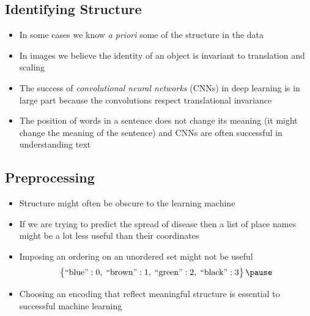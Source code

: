 
\begin{slide}
\section{Identifying Structure}

\begin{PauseHighLight}
  \begin{itemize}
  \item In some cases we know \textit{a priori} some of the structure
    in the data\pause
  \item In images we believe the identity of an object is invariant to
    translation and scaling\pause
  \item The success of \textit{convolutional neural networks} (CNNs)
    in deep learning is in large part because the convolutions respect
    translational invariance\pause
  \item The position of words in a sentence does not change its
    meaning (it might change the meaning of the sentence) and CNNs are
    often successful in understanding text\pause
  \end{itemize}
\end{PauseHighLight}

\end{slide}


\begin{slide}
\section{Preprocessing}

\begin{PauseHighLight}
  \begin{itemize}
  \item Structure might often be obscure to the learning machine\pause
  \item If we are trying to predict the spread of disease then a list
    of place names might be a lot less useful than their
    coordinates\pause
  \item Imposing an ordering on an unordered set might not be useful
    \begin{align*}
      \left\{\strut \text{``blue''}:0,\;\text{``brown''}:1,\;
      \text{``green''}:2,\;\text{``black''}:3 \right\}\pause
    \end{align*}
  \item Choosing an encoding that reflect meaningful structure is
    essential to successful machine learning\pause
  \end{itemize}
\end{PauseHighLight}

\end{slide}

